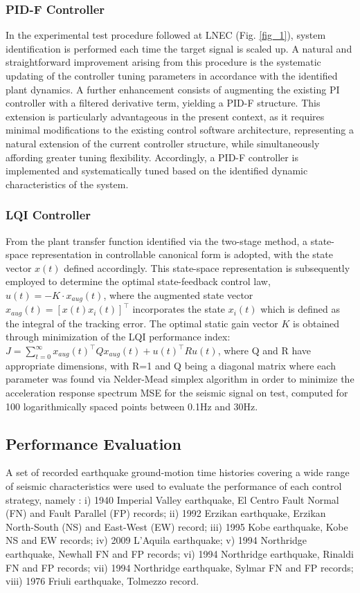 \documentclass[ 10pt, twocolumn]{article} %
\begin{document}
\subsubsection{PID-F Controller}
In the experimental test procedure followed at LNEC (Fig. \ref{fig_1}), system identification is performed each time the target signal is scaled up. A natural and straightforward improvement arising from this procedure is the systematic updating of the controller tuning parameters in accordance with the identified plant dynamics. A further enhancement consists of augmenting the existing PI controller with a filtered derivative term, yielding a PID-F structure. This extension is particularly advantageous in the present context, as it requires minimal modifications to the existing control software architecture, representing a natural extension of the current controller structure, while simultaneously affording greater tuning flexibility. Accordingly, a PID-F controller is implemented and systematically tuned based on the identified dynamic characteristics of the system.

\subsubsection{LQI Controller}
From the plant transfer function identified via the two-stage method, a state-space representation in controllable canonical form is adopted, with the state vector $x(t)$ defined accordingly. This state-space representation is subsequently employed to determine the optimal state-feedback control law, $u(t) = -K \cdot x_{aug}(t)$, where the augmented state vector $x_{aug}(t) = [x(t) x_i(t)]^\intercal$ incorporates the state $x_i(t)$ which is defined as the integral of the tracking error. The optimal static gain vector $K$ is obtained through minimization of the LQI performance index: $ J = \sum_{t=0}^{\infty}{{x_{aug}(t)}^\intercal Q} x_{aug}(t)+{u(t)}^\intercal R u(t) $, where Q and R have appropriate dimensions, with R=1 and Q being a diagonal matrix where each parameter was found via Nelder-Mead simplex algorithm \citep{lagarias1998} in order to minimize the acceleration response spectrum MSE for the seismic signal on test, computed for 100 logarithmically spaced points between 0.1Hz and 30Hz. 

\subsection{Performance Evaluation}

A set of recorded earthquake ground-motion time histories covering a wide range of seismic characteristics were used to evaluate the performance of each control strategy, namely \citep{narasimhan2006}: i) 1940 Imperial Valley earthquake, El Centro Fault Normal (FN) and Fault Parallel (FP) records; ii) 1992 Erzikan earthquake, Erzikan North-South (NS) and East-West (EW) record; iii) 1995 Kobe earthquake, Kobe NS and EW records; iv) 2009 L'Aquila earthquake; v) 1994 Northridge earthquake, Newhall FN and FP records; vi) 1994 Northridge earthquake, Rinaldi FN and FP records; vii) 1994 Northridge earthquake, Sylmar FN and FP records; viii) 1976 Friuli earthquake, Tolmezzo record.
\end{document}
